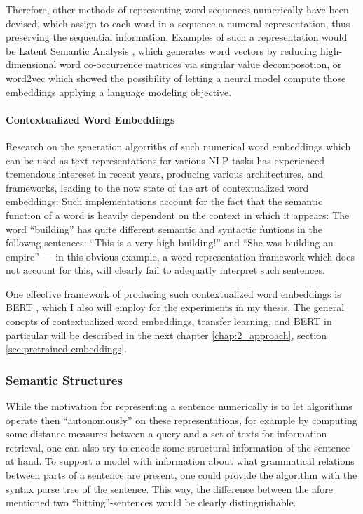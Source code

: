 Therefore, other methods of representing word sequences numerically have been devised, which assign
to each word in a sequence a numeral representation, thus preserving the sequential information.
Examples of such a representation would be Latent Semantic Analysis \citep{furnas1988using}, which
generates word vectors by reducing high-dimensional word co-occurrence matrices via singular value
decomposotion, or word2vec \citep{mikolov2013distributed} which showed the possibility of letting a
neural model compute those embeddings applying a language modeling objective.



\paragraph*{Contextualized Word Embeddings}

Research on the generation algorriths of such numerical word embeddings which can
be used as text representations for various NLP tasks has experienced tremendous
intereset in recent years, producing various architectures, and frameworks, leading
to the now state of the art of contextualized word embeddings: Such implementations
account for the fact that the semantic function of a word is heavily dependent on
the context in which it appears: The word ``building'' has quite different semantic
and syntactic funtions in the followng sentences: ``This is a very high building!''
and ``She was building an empire'' --- in this obvious example, a word representation
framework which does not account for this, will clearly fail to adequatly interpret
such sentences.

One effective framework of producing such contextualized word embeddings is BERT \citep{devlin2018bert},
which I also will employ for the experiments in my thesis. The general concpts of contextualized
word embeddings, transfer learning, and BERT in particular will be described in the next chapter
\ref{chap:2_approach}, section \ref{sec:pretrained-embeddings}.


\subsubsection*{Semantic Structures}

While the motivation for representing a sentence numerically is to let algorithms operate
then ``autonomously'' on these representations, for example by computing some distance measures
between a query and a set of texts for information retrieval, one can also try to encode
some structural information of the sentence at hand.
To support a model with information about what grammatical relations between
parts of a sentence are present, one could provide the algorithm with the syntax parse
tree of the sentence. This way, the difference between the afore mentioned
two ``hitting''-sentences would be clearly distinguishable.

